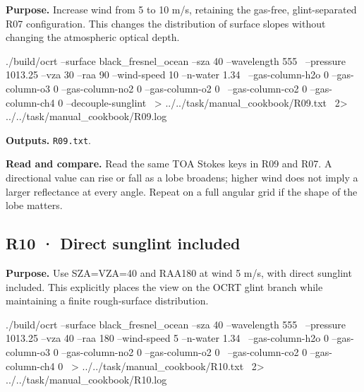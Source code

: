 \textbf{Purpose. }Increase wind from 5 to 10 m/s, retaining the gas-free, glint-separated R07 configuration. This changes the distribution of surface slopes without changing the atmospheric optical depth.

\noindent\begin{minipage}{\linewidth}
\begin{ManualCode}

./build/ocrt --surface black_fresnel_ocean --sza 40 --wavelength 555 \
  --pressure 1013.25 --vza 30 --raa 90 --wind-speed 10 --n-water 1.34 \
  --gas-column-h2o 0 --gas-column-o3 0 --gas-column-no2 0 --gas-column-o2 0 \
  --gas-column-co2 0 --gas-column-ch4 0 --decouple-sunglint \
  > ../../task/manual_cookbook/R09.txt \
  2> ../../task/manual_cookbook/R09.log

\end{ManualCode}
\end{minipage}\par

\textbf{Outputs. }\texttt{R09.txt}.

\textbf{Read and compare. }Read the same TOA Stokes keys in R09 and R07. A directional value can rise or fall as a lobe broadens; higher wind does not imply a larger reflectance at every angle. Repeat on a full angular grid if the shape of the lobe matters.


\subsection{R10 · Direct sunglint included}
\label{sec:auto:09_cookbook:3.4}

\label{recipe:R10}

\textbf{Purpose. }Use SZA=VZA=40\textdegree{} and RAA180\textdegree{} at wind 5 m/s, with direct sunglint included. This explicitly places the view on the OCRT glint branch while maintaining a finite rough-surface distribution.

\noindent\begin{minipage}{\linewidth}
\begin{ManualCode}

./build/ocrt --surface black_fresnel_ocean --sza 40 --wavelength 555 \
  --pressure 1013.25 --vza 40 --raa 180 --wind-speed 5 --n-water 1.34 \
  --gas-column-h2o 0 --gas-column-o3 0 --gas-column-no2 0 --gas-column-o2 0 \
  --gas-column-co2 0 --gas-column-ch4 0 \
  > ../../task/manual_cookbook/R10.txt \
  2> ../../task/manual_cookbook/R10.log

\end{ManualCode}
\end{minipage}\par

